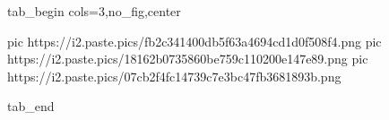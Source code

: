  
 
 
 
 


\ifcmt
  tab_begin cols=3,no_fig,center

     pic https://i2.paste.pics/fb2c341400db5f63a4694cd1d0f508f4.png
		 pic https://i2.paste.pics/18162b0735860be759c110200e147e89.png
		 pic https://i2.paste.pics/07cb2f4fc14739c7e3bc47fb3681893b.png

  tab_end
\fi
